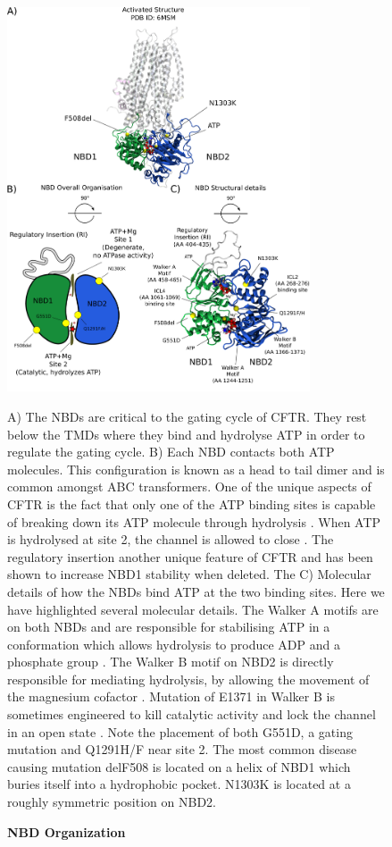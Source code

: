 \begin{figure}
	\begin{center}
	\includegraphics[width=0.8\textwidth]{figures/ATP_head_to_tail_figure.pdf}
	\end{center}
	\label{NBD_structure}
	\captionsetup{singlelinecheck = false, justification=raggedright}
	\caption[NBD Organisation] {\textbf{NBD Organization}}{A) The NBDs are critical to the gating cycle of CFTR. They rest below the TMDs where they bind and hydrolyse ATP in order to regulate the gating cycle. B) Each NBD contacts both ATP molecules. This configuration is known as a head to tail dimer and is common amongst ABC transformers. One of the unique aspects of CFTR is the fact that only one of the ATP binding sites is capable of breaking down its ATP molecule through hydrolysis \cite{stratford2007}. When ATP is hydrolysed at site 2, the channel is allowed to close \cite{infield2021}. The regulatory insertion another unique feature of CFTR and has been shown to increase NBD1 stability when deleted. The  C) Molecular details of how the NBDs bind ATP at the two binding sites. Here we have highlighted several molecular details. The Walker A motifs are on both NBDs and are responsible for stabilising ATP in a conformation which allows hydrolysis to produce ADP and a phosphate group \cite{deltoro2016}. The Walker B motif on NBD2 is directly responsible for mediating hydrolysis, by allowing the movement of the magnesium cofactor \cite{urbatsch2000, rai2006}. Mutation of E1371 in Walker B is sometimes engineered to kill catalytic activity and lock the channel in an open state \cite{stratford2007, zhang2018}. Note the placement of both G551D, a gating mutation and Q1291H/F near site 2. The most common disease causing mutation delF508 is located on a helix of NBD1 which buries itself into a hydrophobic pocket. N1303K is located at a roughly symmetric position on NBD2. } 

\end{figure}

